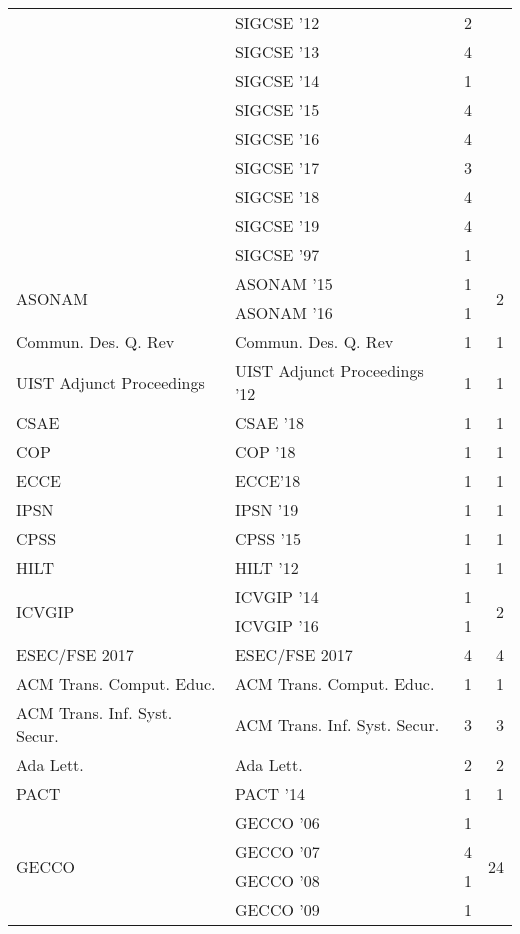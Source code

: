 \begin{table*}[t]
\begin{tabular}{llrr}
& SIGCSE '12 & 2 &\\
& SIGCSE '13 & 4 &\\
& SIGCSE '14 & 1 &\\
& SIGCSE '15 & 4 &\\
& SIGCSE '16 & 4 &\\
& SIGCSE '17 & 3 &\\
& SIGCSE '18 & 4 &\\
& SIGCSE '19 & 4 &\\
& SIGCSE '97 & 1 &\\
\multirow{2}{*}{ASONAM } & ASONAM '15 & 1 & \multirow{2}{*}{2}\\
& ASONAM '16 & 1 &\\
\multirow{1}{*}{Commun. Des. Q. Rev} & Commun. Des. Q. Rev & 1 & \multirow{1}{*}{1}\\
\multirow{1}{*}{UIST Adjunct Proceedings } & UIST Adjunct Proceedings '12 & 1 & \multirow{1}{*}{1}\\
\multirow{1}{*}{CSAE } & CSAE '18 & 1 & \multirow{1}{*}{1}\\
\multirow{1}{*}{COP } & COP '18 & 1 & \multirow{1}{*}{1}\\
\multirow{1}{*}{ECCE} & ECCE'18 & 1 & \multirow{1}{*}{1}\\
\multirow{1}{*}{IPSN } & IPSN '19 & 1 & \multirow{1}{*}{1}\\
\multirow{1}{*}{CPSS } & CPSS '15 & 1 & \multirow{1}{*}{1}\\
\multirow{1}{*}{HILT } & HILT '12 & 1 & \multirow{1}{*}{1}\\
\multirow{2}{*}{ICVGIP } & ICVGIP '14 & 1 & \multirow{2}{*}{2}\\
& ICVGIP '16 & 1 &\\
\multirow{1}{*}{ESEC/FSE 2017} & ESEC/FSE 2017 & 4 & \multirow{1}{*}{4}\\
\multirow{1}{*}{ACM Trans. Comput. Educ.} & ACM Trans. Comput. Educ. & 1 & \multirow{1}{*}{1}\\
\multirow{1}{*}{ACM Trans. Inf. Syst. Secur.} & ACM Trans. Inf. Syst. Secur. & 3 & \multirow{1}{*}{3}\\
\multirow{1}{*}{Ada Lett.} & Ada Lett. & 2 & \multirow{1}{*}{2}\\
\multirow{1}{*}{PACT } & PACT '14 & 1 & \multirow{1}{*}{1}\\
\multirow{14}{*}{GECCO } & GECCO '06 & 1 & \multirow{14}{*}{24}\\
& GECCO '07 & 4 &\\
& GECCO '08 & 1 &\\
& GECCO '09 & 1 &\\

\end{tabular}
\end{table*}
